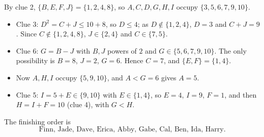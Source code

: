 By clue 2, $\{B,E,F,J\}=\{1,2,4,8\}$, so $A,C,D,G,H,I$ occupy $\{3,5,6,7,9,10\}$.
\begin{itemize}
\item Clue 3: $D^2=C+J\le10+8$, so $D\le4$; as $D\notin\{1,2,4\}$, $D=3$ and $C+J=9$. Since $C\notin\{1,2,4,8\}$, $J\in\{2,4\}$ and $C\in\{7,5\}$.
\item Clue 6: $G=B-J$ with $B,J$ powers of $2$ and $G\in\{5,6,7,9,10\}$. The only possibility is $B=8$, $J=2$, $G=6$. Hence $C=7$, and $\{E,F\}=\{1,4\}$.
\item Now $A,H,I$ occupy $\{5,9,10\}$, and $A<G=6$ gives $A=5$.
\item Clue 5: $I=5+E\in\{9,10\}$ with $E\in\{1,4\}$, so $E=4$, $I=9$, $F=1$, and then $H=I+F=10$ (clue 4), with $G<H$.
\end{itemize}
The finishing order is
\[\boxed{\text{Finn, Jade, Dave, Erica, Abby, Gabe, Cal, Ben, Ida, Harry}}.\]

